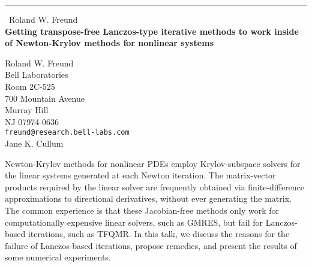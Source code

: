 \documentclass{report}
\begin{document}
\begin{center}
\rule{6in}{1pt} \
{\large Roland W. Freund \\
{\bf Getting transpose-free Lanczos-type iterative methods to work inside of Newton-Krylov methods for nonlinear systems}}

Roland W. Freund \\ Bell Laboratories \\ Room 2C-525 \\ 700 Mountain Avenue \\ Murray Hill \\ NJ 07974-0636
\\
{\tt freund@research.bell-labs.com}\\
Jane K. Cullum\end{center}

Newton-Krylov methods for nonlinear PDEs employ Krylov-subspace
solvers for the linear systems generated at each Newton iteration.
The matrix-vector products required by the linear solver are
frequently obtained via finite-difference approximations to
directional derivatives, without ever generating the matrix.
The common experience is that these Jacobian-free methods only work
for computationally expensive linear solvers, such as GMRES, but fail
for Lanczos-based iterations, such as TFQMR.
In this talk, we discuss the reasons for the failure of
Lanczos-based iterations, propose remedies, and present the
results of some numerical experiments.
\end{document}
